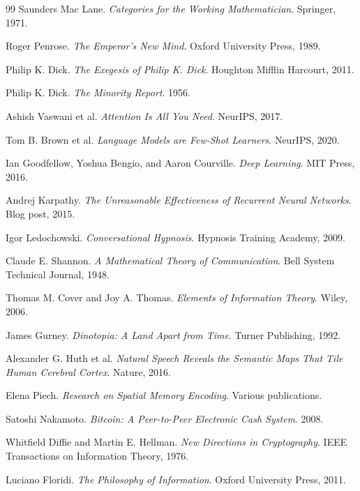 \documentclass[12pt, letterpaper]{article}
\theoremstyle{flyxion}
\begin{document}
\begin{thebibliography}{99}
Saunders Mac Lane.
\textit{Categories for the Working Mathematician}.
Springer, 1971.

Roger Penrose.
\textit{The Emperor's New Mind}.
Oxford University Press, 1989.

Philip K. Dick.
\textit{The Exegesis of Philip K. Dick}.
Houghton Mifflin Harcourt, 2011.

Philip K. Dick.
\textit{The Minority Report}.
1956.

Ashish Vaswani et al.
\textit{Attention Is All You Need}.
NeurIPS, 2017.

Tom B. Brown et al.
\textit{Language Models are Few-Shot Learners}.
NeurIPS, 2020.

Ian Goodfellow, Yoshua Bengio, and Aaron Courville.
\textit{Deep Learning}.
MIT Press, 2016.

Andrej Karpathy.
\textit{The Unreasonable Effectiveness of Recurrent Neural Networks}.
Blog post, 2015.

Igor Ledochowski.
\textit{Conversational Hypnosis}.
Hypnosis Training Academy, 2009.

Claude E. Shannon.
\textit{A Mathematical Theory of Communication}.
Bell System Technical Journal, 1948.

Thomas M. Cover and Joy A. Thomas.
\textit{Elements of Information Theory}.
Wiley, 2006.

James Gurney.
\textit{Dinotopia: A Land Apart from Time}.
Turner Publishing, 1992.

Alexander G. Huth et al.
\textit{Natural Speech Reveals the Semantic Maps That Tile Human Cerebral Cortex}.
Nature, 2016.

Elena Piech.
\textit{Research on Spatial Memory Encoding}.
Various publications.

Satoshi Nakamoto.
\textit{Bitcoin: A Peer-to-Peer Electronic Cash System}.
2008.

Whitfield Diffie and Martin E. Hellman.
\textit{New Directions in Cryptography}.
IEEE Transactions on Information Theory, 1976.

Luciano Floridi.
\textit{The Philosophy of Information}.
Oxford University Press, 2011.

\end{thebibliography}
\end{document}
